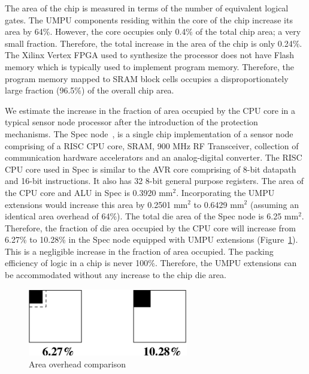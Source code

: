The area of the chip is measured in terms of the number of equivalent
logical gates.
%
The UMPU components residing within the core of the chip increase its
area by 64\%.
%
However, the core occupies only 0.4\% of the total chip area; a very
small fraction.
%
Therefore, the total increase in the area of the chip is only 0.24\%.
%
The Xilinx Vertex FPGA used to synthesize the processor does not have
Flash memory which is typically used to implement program memory.
%
Therefore, the program memory mapped to SRAM block cells occupies a
disproportionately large fraction (96.5\%) of the overall chip area.
%

We estimate the increase in the fraction of area occupied by the CPU
core in a typical sensor node processor after the introduction of the
protection mechanisms.
%
The Spec node~\cite{jasonhillthesis}, is a single chip implementation
of a sensor node comprising of a RISC CPU core, SRAM, 900 MHz RF
Transceiver, collection of communication hardware accelerators and an
analog-digital converter.
%
The RISC CPU core used in Spec is similar to the AVR core comprising
of 8-bit datapath and 16-bit instructions.
%
It also has 32 8-bit general purpose registers.
%
The area of the CPU core and ALU in Spec is 0.3920 mm$^2$.
%
Incorporating the UMPU extensions would increase this area by 0.2501
mm$^2$ to 0.6429 mm$^2$ (assuming an identical area overhead of 64\%).
%
The total die area of the Spec node is 6.25 mm$^2$.
%
Therefore, the fraction of die area occupied by the CPU core will
increase from 6.27\% to 10.28\% in the Spec node equipped with UMPU
extensions (Figure~\ref{fig:dieareacmp}).
%
This is a negligible increase in the fraction of area occupied.
%
The packing efficiency of logic in a chip is never 100\%.
%
Therefore, the UMPU extensions can be accommodated without any increase
to the chip die area.
%
\begin{figure}[htbp]
  \centering
   \includegraphics[height = 1.15in, keepaspectratio=true]{figures/areacomp.eps} 
   \caption{Area overhead comparison}
   \label{fig:dieareacmp}
\end{figure}

